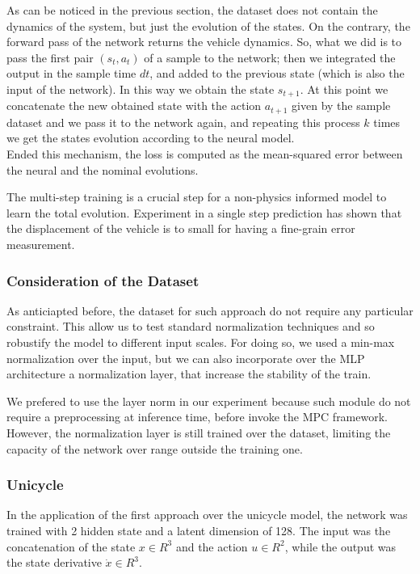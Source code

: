 As can be noticed in the previous section, the dataset does not contain the dynamics of the system, 
but just the evolution of the states. On the contrary, the forward pass of the network returns
the vehicle dynamics. So, what we did is to pass the first pair $(s_t, a_t)$ of a sample to the 
network; then we integrated the output in the sample time $dt$, 
and added to the previous state (which is also the input of the network).
In this way we obtain the state $s_{t+1}$.
At this point we concatenate the new obtained state with the action $a_{t+1}$ given by the sample dataset
and we pass it to the network again, and repeating
this process $k$ times we get the states evolution according to the neural model. \\
Ended this mechanism, the loss is computed as the mean-squared error between the neural and the nominal evolutions. 

The multi-step training is a crucial step for a non-physics informed model to learn the total evolution. 
Experiment in a single step prediction has shown that the displacement of the vehicle is to small for having a fine-grain error measurement. 

\subsubsection{Consideration of the Dataset}
As anticiapted before, the dataset for such approach do not require any particular constraint. This allow us to test standard normalization techniques
and so robustify the model to different input scales. 
For doing so, we used a min-max normalization over the input, but we can also incorporate over the MLP architecture a normalization layer, that increase the stability of the train.

We prefered to use the layer norm in our experiment because such module do not require a preprocessing at inference time, before invoke the MPC framework.
However, the normalization layer is still trained over the dataset, limiting the capacity of the network over range outside the training one. 

\subsubsection{Unicycle}
In the application of the first approach over the unicycle model, the network was trained with 2 hidden state and a latent dimension of 128. 
The input was the concatenation of the state $x \in R^3$ and the action $u \in R^2$, while the output was the state derivative $\dot x \in R^3$.

